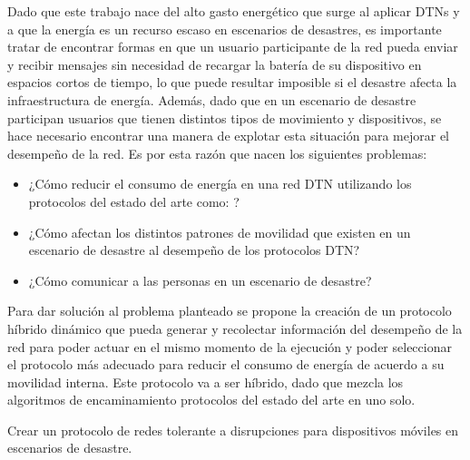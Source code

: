 
Dado que este trabajo nace del alto gasto energético que surge al aplicar DTNs y
a que la energía es un recurso escaso en escenarios de desastres, es importante
tratar de encontrar formas en que un usuario participante de la red pueda enviar
y recibir mensajes sin necesidad de recargar la batería de su dispositivo en
espacios cortos de tiempo, lo que puede resultar imposible si el desastre afecta
la infraestructura de energía. Además, dado que en un escenario de desastre
participan usuarios que tienen distintos tipos de movimiento y dispositivos, se
hace necesario encontrar una manera de explotar esta situación para mejorar el
desempeño de la red.  Es por esta razón que nacen los siguientes problemas:


\begin{itemize}
    \item ¿Cómo reducir el consumo de energía en una red DTN utilizando los
      protocolos del estado del arte como: \protocolos?
    \item ¿Cómo afectan los distintos patrones de movilidad que existen en un
    escenario de desastre al desempeño de los protocolos DTN?  
    \item ¿Cómo comunicar a las personas en un escenario de desastre?
\end{itemize}




Para dar solución al problema planteado se propone la creación de un protocolo
híbrido dinámico que pueda generar y recolectar información del desempeño de la
red para poder actuar en el mismo momento de la ejecución y poder seleccionar el
protocolo más adecuado para reducir el consumo de energía de acuerdo a su
movilidad interna. Este protocolo va a ser híbrido, dado que mezcla los
algoritmos de encaminamiento protocolos del estado del arte en uno solo.








{
Crear un protocolo de redes tolerante a disrupciones para dispositivos móviles
en escenarios de desastre. 
}

